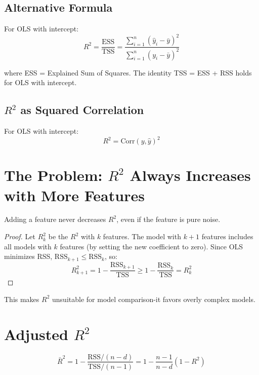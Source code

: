 \documentclass[main.tex]{subfiles}
\begin{document}
\subsection{Alternative Formula}

For OLS with intercept:
$$R^2 = \frac{\text{ESS}}{\text{TSS}} = \frac{\sum_{i=1}^{n}(\hat{y}_i - \bar{y})^2}{\sum_{i=1}^{n}(y_i - \bar{y})^2}$$

where ESS = Explained Sum of Squares. The identity TSS = ESS + RSS holds for OLS with intercept.

\subsection{$R^2$ as Squared Correlation}

\begin{theorem}
For OLS with intercept:
$$R^2 = \text{Corr}(y, \hat{y})^2$$
\end{theorem}

\needspace{0.33\textheight}
\section{The Problem: $R^2$ Always Increases with More Features}

\begin{theorem}
Adding a feature never decreases $R^2$, even if the feature is pure noise.
\end{theorem}

\begin{proof}
Let $R^2_k$ be the $R^2$ with $k$ features. The model with $k+1$ features includes all models with $k$ features (by setting the new coefficient to zero). Since OLS minimizes RSS, $\text{RSS}_{k+1} \leq \text{RSS}_k$, so:
$$R^2_{k+1} = 1 - \frac{\text{RSS}_{k+1}}{\text{TSS}} \geq 1 - \frac{\text{RSS}_k}{\text{TSS}} = R^2_k$$
\end{proof}

This makes $R^2$ unsuitable for model comparison-it favors overly complex models.

\needspace{0.33\textheight}
\section{Adjusted $R^2$}

\begin{definition}[Adjusted $R^2$]
$$\bar{R}^2 = 1 - \frac{\text{RSS}/(n-d)}{\text{TSS}/(n-1)} = 1 - \frac{n-1}{n-d}(1 - R^2)$$
\end{definition}
\end{document}
